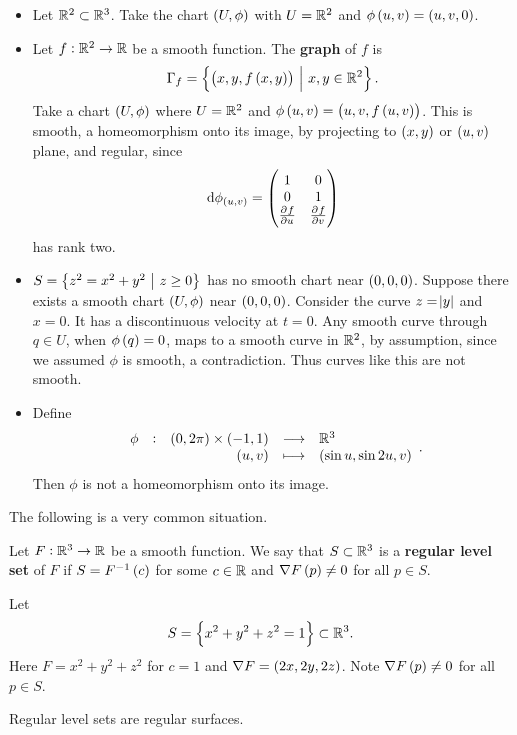 \begin{example*}
\hfill
\begin{itemize}
\item Let $ \mathbb{R}^2 \subset \mathbb{R}^3 $. Take the chart $ \br{U, \phi} $ with $ U = \mathbb{R}^2 $ and $ \phi\br{u, v} = \br{u, v, 0} $.
\item Let $ f : \mathbb{R}^2 \to \mathbb{R} $ be a smooth function. The \textbf{graph} of $ f $ is
$$ \Gamma_f = \cbr{\br{x, y, f\br{x, y}} \st x, y \in \RR^2}. $$
Take a chart $ \br{U, \phi} $ where $ U = \mathbb{R}^2 $ and $ \phi\br{u, v} = \br{u, v, f\br{u, v}} $. This is smooth, a homeomorphism onto its image, by projecting to $ \br{x, y} $ or $ \br{u, v} $ plane, and regular, since
$$ \d\phi_{\br{u, v}} = \threebyone{1 & 0}{0 & 1}{\tpd{f}{u} & \tpd{f}{v}} $$
has rank two.
\item $ S = \cbr{z^2 = x^2 + y^2 \st z \ge 0} $ has no smooth chart near $ \br{0, 0, 0} $. Suppose there exists a smooth chart $ \br{U, \phi} $ near $ \br{0, 0, 0} $. Consider the curve $ z = \abs{y} $ and $ x = 0 $. It has a discontinuous velocity at $ t = 0 $. Any smooth curve through $ q \in U $, when $ \phi\br{q} = 0 $, maps to a smooth curve in $ \mathbb{R}^2 $, by assumption, since we assumed $ \phi $ is smooth, a contradiction. Thus curves like this are not smooth.
\item Define
$$ \function[\phi]{\br{0, 2\pi} \times \br{-1, 1}}{\RR^3}{\br{u, v}}{\br{\sin u, \sin 2u, v}}. $$
Then $ \phi $ is not a homeomorphism onto its image.
\end{itemize}
\end{example*}


The following is a very common situation.

\begin{definition}
Let $ F : \mathbb{R}^3 \to \mathbb{R} $ be a smooth function. We say that $ S \subset \mathbb{R}^3 $ is a \textbf{regular level set} of $ F $ if $ S = F^{-1}\br{c} $ for some $ c \in \mathbb{R} $ and $ \nabla F\br{p} \ne 0 $ for all $ p \in S $.
\end{definition}

\begin{example*}
Let
$$ S = \cbr{x^2 + y^2 + z^2 = 1} \subset \RR^3. $$
Here $ F = x^2 + y^2 + z^2 $ for $ c = 1 $ and $ \nabla F = \br{2x, 2y, 2z} $. Note $ \nabla F\br{p} \ne 0 $ for all $ p \in S $.
\end{example*}

\pagebreak

\begin{proposition}
\label{prop:regularlevelsets}
Regular level sets are regular surfaces.
\end{proposition}

